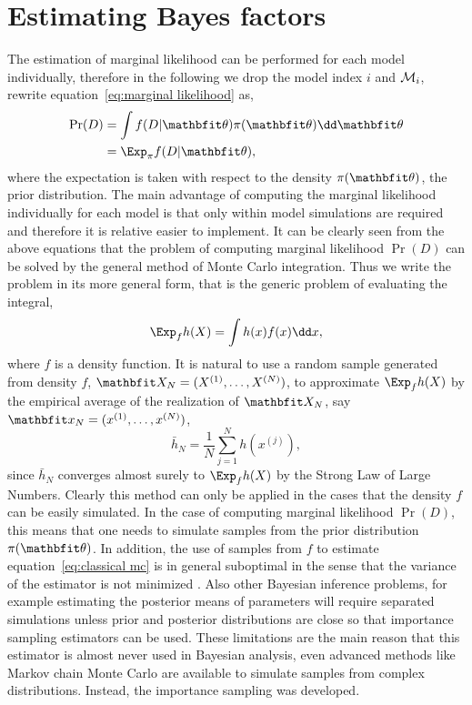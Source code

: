 \section{Estimating Bayes factors}
\label{sec:Estimating Bayes factors}

The estimation of marginal likelihood can be performed for each model
individually, therefore in the following we drop the model index $i$ and
$\mathcal{M}_i$, rewrite equation~\eqref{eq:marginal likelihood} as,
\begin{align}
  \Pr(D) & = \int f(D|\bth)\pi(\bth)\dd\bth \\
  & = \Exp_{\pi} f(D|\bth),
\end{align}
where the expectation is taken with respect to the density $\pi(\bth)$, the
prior distribution. The main advantage of computing the marginal likelihood
individually for each model is that only within model simulations are required
and therefore it is relative easier to implement. It can be clearly seen from
the above equations that the problem of computing marginal likelihood $\Pr(D)$
can be solved by the general method of Monte Carlo integration. Thus we write
the problem in its more general form, that is the generic problem of
evaluating the integral,
\begin{equation}
  \Exp_f h(X) = \int h(x) f(x)
  \dd x,
  \label{eq:classical mc}
\end{equation}
where $f$ is a density function. It is natural to use a random sample
generated from density $f$, $\bfX_N = (\mcvec{X}{N})$, to approximate $\Exp_f
h(X)$ by the empirical average of the realization of $\bfX_N$, say $\bfx_N =
(\mcvec{x}{N})$,
\begin{equation}
  \bar{h}_N = \frac{1}{N}\sum_{j=1}^N h(x^{(j)}),
  \label{eq:is convergence}
\end{equation}
since $\bar{h}_N$ converges almost surely to $\Exp_f h(X)$ by the Strong Law
of Large Numbers. Clearly this method can only be applied in the cases that
the density $f$ can be easily simulated. In the case of computing marginal
likelihood $\Pr(D)$, this means that one needs to simulate samples from the
prior distribution $\pi(\bth)$. In addition, the use of samples from $f$ to
estimate equation~\eqref{eq:classical mc} is in general suboptimal in the
sense that the variance of the estimator is not minimized
\parencite[see][sec.~3.3]{Robert2004}. Also other Bayesian inference problems,
for example estimating the posterior means of parameters will require
separated simulations unless prior and posterior distributions are close so
that importance sampling estimators can be used. These limitations are the
main reason that this estimator is almost never used in Bayesian analysis,
even advanced methods like Markov chain Monte Carlo are available to simulate
samples from complex distributions. Instead, the importance sampling was
developed.

